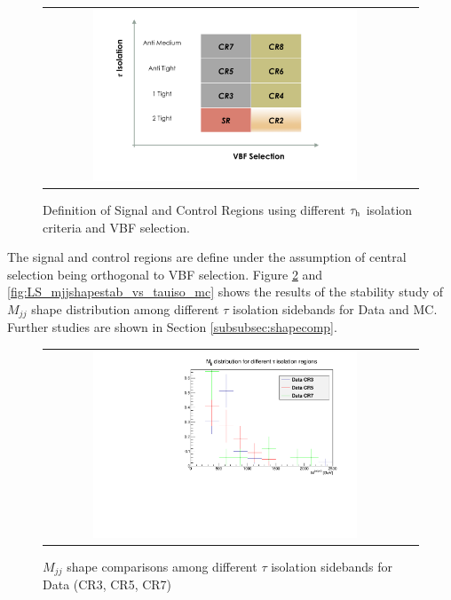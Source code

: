 \begin{figure}[tbh!]
	\centering
	\begin{tabular}{cc}
		\includegraphics[width=0.75\textwidth]{PLOTS/diTauHadLSotherPlots/controlregions.png}
	\end{tabular}
	\caption{Definition of Signal and Control Regions using different $\tau_{\text{h}}$ isolation criteria and VBF selection.}
	\label{fig:crs}
\end{figure}

The signal and control regions are define under the assumption of central selection being orthogonal to VBF selection. Figure \ref{fig:LS_mjjshapestab_vs_tauiso_data} and \ref{fig:LS_mjjshapestab_vs_tauiso_mc} shows the results of the stability study of $M_{jj}$ shape distribution among different $\tau$ isolation sidebands for Data and MC. Further studies are shown in Section \ref{subsubsec:shapecomp}.

\begin{figure}[tbh!]
	\centering
	\begin{tabular}{cc}
		\includegraphics[width=0.75\textwidth]{PLOTS/diTauHadLSotherPlots/LS_mjjshapestab_vs_tauiso_data.pdf}
	\end{tabular}
	\caption{$M_{jj}$ shape comparisons among different $\tau$ isolation sidebands for Data (CR3, CR5, CR7)}
	\label{fig:LS_mjjshapestab_vs_tauiso_data}
\end{figure}

